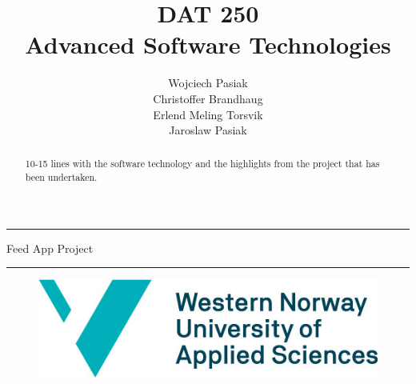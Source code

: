 \documentclass[11pt]{article}
\begin{document}
\title{DAT 250\\Advanced Software Technologies}

\author{Wojciech Pasiak\\Christoffer Brandhaug\\Erlend Meling Torsvik\\Jaroslaw Pasiak}

\maketitle

\rule{\textwidth}{1.6pt}\vspace*{\baselineskip}\vspace{2pt}
\vspace{0.75\baselineskip}
{\huge \centering
Feed App Project\\}
\vspace{0.75\baselineskip}
\rule{\textwidth}{1.6pt}\vspace*{-\baselineskip}\vspace{2pt}
\vspace{9pc}
\begin{figure}[H]
  \centering
  \includegraphics[scale=0.5]{figs/HVL_logo.jpg}
  \label{fig:logo}
\end{figure}
\newpage
\tableofcontents
\newpage

\begin{abstract}

  10-15 lines with the software technology and the highlights from the
  project that has been undertaken.

\end{abstract}

%















\end{document}
